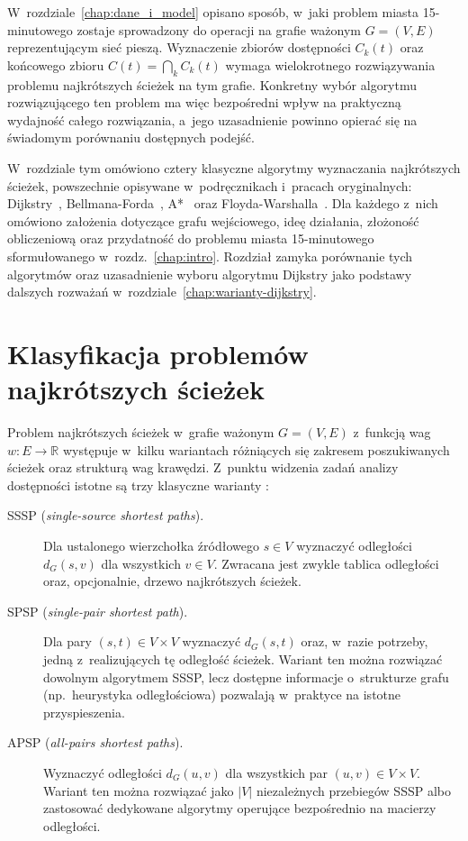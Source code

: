 \label{chap:sssp}

W~rozdziale~\ref{chap:dane_i_model} opisano sposób, w~jaki problem miasta 15-minutowego
zostaje sprowadzony do operacji na grafie ważonym $G=(V,E)$
reprezentującym sieć pieszą. Wyznaczenie zbiorów dostępności $C_k(t)$
oraz końcowego zbioru $C(t)=\bigcap_k C_k(t)$ wymaga wielokrotnego
rozwiązywania problemu najkrótszych ścieżek na tym grafie. Konkretny
wybór algorytmu rozwiązującego ten problem ma więc bezpośredni wpływ
na praktyczną wydajność całego rozwiązania, a~jego uzasadnienie powinno
opierać się na świadomym porównaniu dostępnych podejść.

W~rozdziale tym omówiono cztery klasyczne algorytmy wyznaczania
najkrótszych ścieżek, powszechnie opisywane w~podręcznikach i~pracach
oryginalnych: Dijkstry~\cite{dijkstra},
Bellmana-Forda~\cite{bellman1958}, A*~\cite{hart1968astar} oraz
Floyda-Warshalla~\cite{floyd1962,warshall1962}. Dla każdego z~nich
omówiono założenia dotyczące grafu wejściowego, ideę działania, złożoność
obliczeniową oraz przydatność do problemu miasta 15-minutowego sformułowanego
w~rozdz.~\ref{chap:intro}. Rozdział zamyka porównanie tych algorytmów
oraz uzasadnienie wyboru algorytmu Dijkstry jako podstawy dalszych
rozważań w~rozdziale~\ref{chap:warianty-dijkstry}.

\section{Klasyfikacja problemów najkrótszych ścieżek}
\label{sec:sssp:klasyfikacja}

Problem najkrótszych ścieżek w~grafie ważonym $G=(V,E)$ z~funkcją wag
$w:E\to\mathbb{R}$ występuje w~kilku wariantach różniących się zakresem
poszukiwanych ścieżek oraz strukturą wag krawędzi. Z~punktu widzenia
zadań analizy dostępności istotne są trzy klasyczne warianty
\cite{cormen2009introduction}:

\begin{description}
  \item[SSSP (\emph{single-source shortest paths}).]
        Dla ustalonego wierzchołka źródłowego $s\in V$ wyznaczyć
        odległości $d_G(s,v)$ dla wszystkich $v\in V$. Zwracana jest
        zwykle tablica odległości oraz, opcjonalnie, drzewo
        najkrótszych ścieżek.
\clearpage
  \item[SPSP (\emph{single-pair shortest path}).]
        Dla pary $(s,t)\in V\times V$ wyznaczyć $d_G(s,t)$ oraz, w~razie
        potrzeby, jedną z~realizujących tę odległość ścieżek. Wariant
        ten można rozwiązać dowolnym algorytmem SSSP, lecz dostępne
        informacje o~strukturze grafu (np.\ heurystyka odległościowa)
        pozwalają w~praktyce na istotne przyspieszenia.
  \item[APSP (\emph{all-pairs shortest paths}).]
        Wyznaczyć odległości $d_G(u,v)$ dla wszystkich par
        $(u,v)\in V\times V$. Wariant ten można rozwiązać jako
        $|V|$ niezależnych przebiegów SSSP albo zastosować
        dedykowane algorytmy operujące bezpośrednio na macierzy
        odległości.
\end{description}

